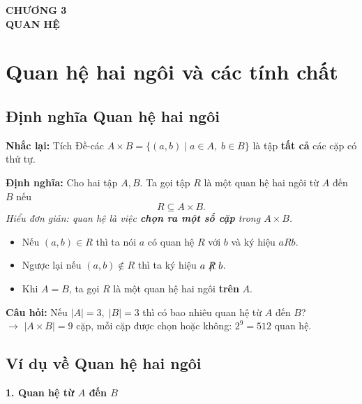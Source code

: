 \documentclass[12pt,a4paper]{article}
\newcommand{\notrel}[1]{\mathrel{\ooalign{$#1$\cr\hidewidth$/$\hidewidth}}}
\begin{document}
\begin{center}
  {\LARGE\bfseries\color{PrimaryBlue} CHƯƠNG 3}\\[4pt]
  {\large\bfseries QUAN HỆ}
\end{center}
\vspace{4pt}

\section{Quan hệ hai ngôi và các tính chất}

\subsection{Định nghĩa Quan hệ hai ngôi}

\textbf{\textcolor{AccentRed}{Nhắc lại:}} Tích Đề-các $A \times B = \{(a, b) \mid a \in A,\; b \in B\}$ là tập \textbf{tất cả} các cặp có thứ tự.

\textbf{\textcolor{AccentRed}{Định nghĩa:}} Cho hai tập $A, B$. Ta gọi tập $R$ là một \textcolor{AccentRed}{quan hệ hai ngôi} từ $A$ đến $B$ nếu
\[
  R \subseteq A \times B.
\]
\textit{Hiểu đơn giản: quan hệ là việc \textbf{chọn ra một số cặp} trong $A \times B$.}

\begin{itemize}
  \item Nếu $(a, b) \in R$ thì ta nói $a$ có quan hệ $R$ với $b$ và ký hiệu $aRb$.
  \item Ngược lại nếu $(a, b) \notin R$ thì ta ký hiệu $a \notrel{R} b$.
  \item Khi $A = B$, ta gọi $R$ là một quan hệ hai ngôi \textbf{trên} $A$.
\end{itemize}

\textbf{Câu hỏi:} Nếu $|A| = 3,\; |B| = 3$ thì có bao nhiêu quan hệ từ $A$ đến $B$?\\
$\rightarrow$ $|A \times B| = 9$ cặp, mỗi cặp được chọn hoặc không: $2^9 = 512$ quan hệ.

\subsection{Ví dụ về Quan hệ hai ngôi}

\textbf{1. Quan hệ từ $A$ đến $B$}
\end{document}
